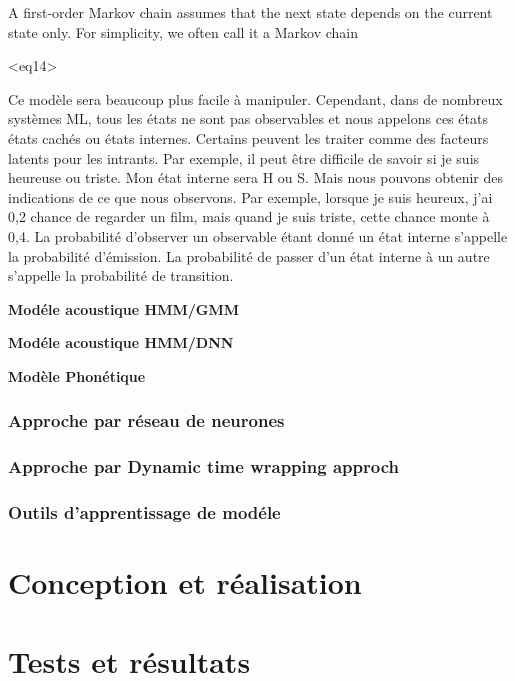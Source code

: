 \documentclass[a4paper, 12pt]{book}
\begin{document}
A first-order Markov chain assumes that the next state depends on the current state only. For simplicity, we often call it a Markov chain

<eq14>

Ce modèle sera beaucoup plus facile à manipuler. Cependant, dans de nombreux systèmes ML, tous les états ne sont pas observables et nous appelons ces états états cachés ou états internes. Certains peuvent les traiter comme des facteurs latents pour les intrants. Par exemple, il peut être difficile de savoir si je suis heureuse ou triste. Mon état interne sera {H ou S}. Mais nous pouvons obtenir des indications de ce que nous observons. Par exemple, lorsque je suis heureux, j'ai 0,2 chance de regarder un film, mais quand je suis triste, cette chance monte à 0,4. La probabilité d'observer un observable étant donné un état interne s'appelle la probabilité d'émission. La probabilité de passer d'un état interne à un autre s'appelle la probabilité de transition.

\textbf{Modéle acoustique HMM/GMM}

\textbf{Modéle acoustique HMM/DNN}

\textbf{Modèle Phonétique}

\subsection{Approche par réseau de neurones}

\subsection{Approche par Dynamic time wrapping approch}

\subsection{Outils d'apprentissage de modéle}


\chapter{Conception et réalisation}


\chapter{Tests et résultats}

\end{document}
